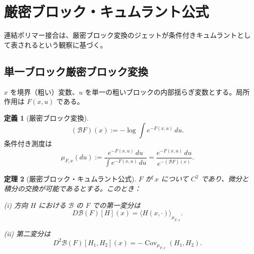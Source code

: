 \documentclass[12pt]{article}
\theoremstyle{plain}
\newtheorem{theorem}{定理}[section]
\theoremstyle{definition}
\newtheorem{definition}[theorem]{定義}
\numberwithin{equation}{section}
\newcommand{\Cov}{\operatorname{Cov}}
\begin{document}
\section{厳密ブロック・キュムラント公式}\label{sec:cumulant}

連結ポリマー接合は、厳密ブロック変換のジェットが条件付きキュムラントとして表されるという観察に基づく。

\subsection{単一ブロック厳密ブロック変換}

$x$ を境界（粗い）変数、$u$ を単一の粗いブロックの内部揺らぎ変数とする。局所作用は $F(x,u)$ である。

\begin{definition}[厳密ブロック変換]
\begin{equation}
(\mathcal{B}F)(x) := -\log\int e^{-F(x,u)}\,du.
\end{equation}
条件付き測度は
\begin{equation}
\mu_{F,x}(du) := \frac{e^{-F(x,u)}\,du}{\int e^{-F(x,u)}\,du} = \frac{e^{-F(x,u)}\,du}{e^{-(\mathcal{B}F)(x)}}.
\end{equation}
\end{definition}

\begin{theorem}[厳密ブロック・キュムラント公式]\label{thm:cumulantformula}
$F$ が $x$ について $C^2$ であり、微分と積分の交換が可能であるとする。このとき：

\emph{(i)} 方向 $H$ における $\mathcal{B}$ の $F$ での第一変分は
\begin{equation}
D\mathcal{B}(F)[H](x) = \langle H(x,\cdot)\rangle_{\mu_{F,x}}.
\end{equation}

\emph{(ii)} 第二変分は
\begin{equation}
D^2\mathcal{B}(F)[H_1,H_2](x) = -\Cov_{\mu_{F,x}}(H_1,H_2).
\end{equation}
\end{theorem}
\end{document}
